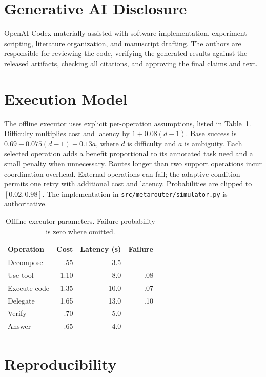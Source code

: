 \documentclass[sigconf]{acmart}
\begin{document}
\section*{Generative AI Disclosure}
OpenAI Codex materially assisted with software implementation, experiment scripting, literature organization, and manuscript drafting. The authors are responsible for reviewing the code, verifying the generated results against the released artifacts, checking all citations, and approving the final claims and text.




\appendix

\section{Execution Model}

The offline executor uses explicit per-operation assumptions, listed in Table~\ref{tab:parameters}. Difficulty multiplies cost and latency by $1+0.08(d-1)$. Base success is $0.69-0.075(d-1)-0.13a$, where $d$ is difficulty and $a$ is ambiguity. Each selected operation adds a benefit proportional to its annotated task need and a small penalty when unnecessary. Routes longer than two support operations incur coordination overhead. External operations can fail; the adaptive condition permits one retry with additional cost and latency. Probabilities are clipped to $[0.02,0.98]$. The implementation in \texttt{src/metarouter/simulator.py} is authoritative.

\begin{table}[h]
\caption{Offline executor parameters. Failure probability is zero where omitted.}
\label{tab:parameters}
\small
\begin{tabular}{lrrr}
\toprule
Operation & Cost & Latency (s) & Failure \\
\midrule
Decompose & .55 & 3.5 & -- \\
Use tool & 1.10 & 8.0 & .08 \\
Execute code & 1.35 & 10.0 & .07 \\
Delegate & 1.65 & 13.0 & .10 \\
Verify & .70 & 5.0 & -- \\
Answer & .65 & 4.0 & -- \\
\bottomrule
\end{tabular}
\end{table}

\section{Reproducibility}
\end{document}
